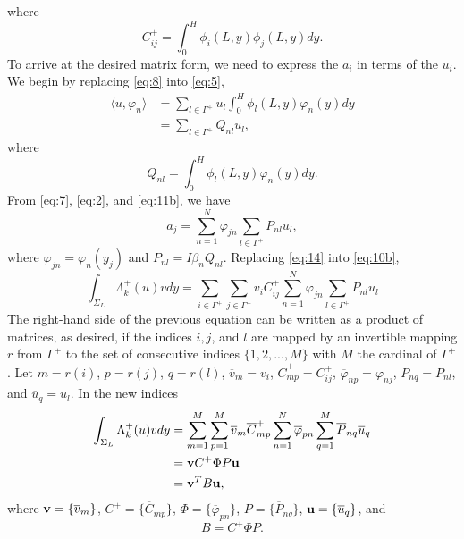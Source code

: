 \documentclass[11pt]{article}
\newcommand{\ol}[1]{\overline{#1}}
\begin{document}
where 
\begin{equation}
  \label{eq:12}
  C_{ij}^+ = \int_0^H \phi_i(L,y)\phi_j(L,y)dy.
\end{equation}
To arrive at the desired matrix form, we need to express the $a_i$ in terms of the $u_i$. We begin by replacing \eqref{eq:8} into \eqref{eq:5},
\begin{align}
  \label{eq:11}
  \langle u, \varphi_n \rangle &= \sum_{l\in\Gamma^+} u_l \int_0^H \phi_l(L,y) \varphi_n(y) dy \\
  &= \sum_{l\in\Gamma^+} Q_{nl} u_l, \label{eq:11b}
\end{align}
where
\begin{equation}
  \label{eq:13}
  Q_{nl} = \int_0^H \phi_l(L,y) \varphi_n(y) dy.
\end{equation}
From \eqref{eq:7}, \eqref{eq:2}, and \eqref{eq:11b}, we have
\begin{equation}
  \label{eq:14}
  a_j = \sum_{n=1}^N \varphi_{jn} \sum_{l\in\Gamma^+}P_{nl}u_l,
\end{equation}
where $\varphi_{jn} = \varphi_n(y_j)$ and $P_{nl} = I \beta_n Q_{nl}$. Replacing \eqref{eq:14} into \eqref{eq:10b},
\begin{equation}
  \label{eq:15}
  \int_{\Sigma_L}\Lambda_k^+(u) v dy = \sum_{i\in\Gamma^+}\sum_{j\in\Gamma^+} v_i C_{ij}^+ \sum_{n=1}^N \varphi_{jn} \sum_{l\in\Gamma^+}P_{nl}u_l
\end{equation}
The right-hand side of the previous equation can be written as a product of matrices, as desired, if the indices $i, j$, and $l$ are mapped  by an invertible mapping $r$ from $\Gamma^+$ to the set of consecutive indices $\{1,2,...,M\}$ with $M$ the cardinal of $\Gamma^+$. Let $m=r(i)$, $p=r(j)$, $q=r(l)$, $\ol{v}_m = v_i$, $\ol{C}_{mp}^+ = C_{ij}^+$, $\ol{\varphi}_{np} = \varphi_{nj}$, $\ol{P}_{nq} = P_{nl}$, and $\ol{u}_q = u_l$. In the new indices
\begin{align}
  \int_{\Sigma_L}\Lambda_k^+(u) v dy &= \sum_{m=1}^M\sum_{p=1}^M \ol{v}_m \ol{C}_{mp}^+ \sum_{n=1}^N \ol{\varphi}_{pn} \sum_{q=1}^M\ol{P}_{nq}\ol{u}_q \\
                                     &= {\bf v} C^+ \Phi P {\bf u} \\
  & = {\bf v}^T B {\bf u},
\end{align}
where ${\bf v} = \{\ol{v}_m\}$, $C^+ = \{\ol{C}_{mp}\}$, $\Phi=\{\ol{\varphi}_{pn}\}$, $P = \{\ol{P}_{nq}\}$, ${\bf u} = \{\ol{u}_q\}$, and
\begin{equation}
  \label{eq:26}
  B = C^+ \Phi P.
\end{equation}
\end{document}
